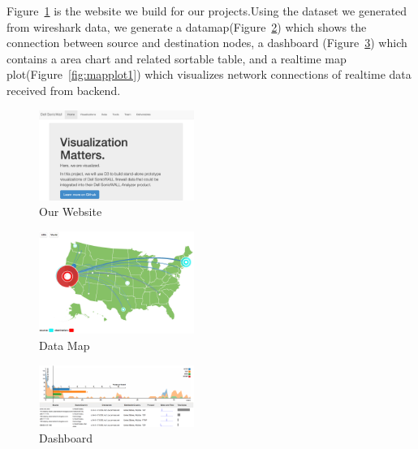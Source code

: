 \documentclass[paper=a4, fontsize=11pt]{report} %
\begin{document}
\begin{description}[style=nextline]
	\item[\href{http://sjengle.cs.usfca.edu/cs690-sonicwall/deliverables.html}{Our Visualizations}]
    Figure~\ref{fig:website} is the website we build for our projects.Using the dataset we generated
from wireshark data, we generate a datamap(Figure~\ref{fig:datamap}) which shows the connection
between source and destination nodes, a dashboard (Figure~\ref{fig:dashboard1}) which contains a
area chart and related sortable table, and a  realtime map plot(Figure~\ref{fig:mapplot1}) which
visualizes network connections of realtime data received from backend.

	\begin{figure}[H]
        \begin{center}
            \includegraphics[width=0.45\textwidth]{website.png}
        \end{center}
        \caption{Our Website}\label{fig:website}
    \end{figure}

	\begin{figure}[H]
        \begin{center}
            \includegraphics[width=0.45\textwidth]{datamap.png}
        \end{center}
        \caption{Data Map}\label{fig:datamap}
    \end{figure}

	\begin{figure}[H]
        \begin{center}
            \includegraphics[width=0.45\textwidth]{dashboard.png}
        \end{center}
        \caption{Dashboard}\label{fig:dashboard1}
    \end{figure}


\end{description}
\end{document}

